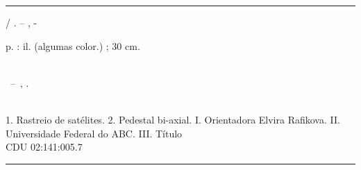 %
%     
\begin{fichacatalografica}
	\vspace*{\fill}					%
	\hrule							%
	\begin{center}					%
	\begin{minipage}[c]{12.5cm}		%
	
	\imprimirautor
	
	\hspace{0.5cm} \imprimirtitulo  / \imprimirautor. --
	\imprimirlocal, \imprimirdata-
	
	\hspace{0.5cm} \pageref{LastPage} p. : il. (algumas color.) ; 30 cm.\\
	
	\hspace{0.5cm} \imprimirorientadorRotulo~\imprimirorientador\\
	
	\hspace{0.5cm}
	\parbox[t]{\textwidth}{\imprimirtipotrabalho~--~\imprimirinstituicao,
	\imprimirdata.}\\
	
	\hspace{0.5cm}
		1. Rastreio de satélites.
		2. Pedestal bi-axial.
		I. Orientadora Elvira Rafikova.
		II. Universidade Federal do ABC.
		III. Título\\ 			
	
	\hspace{8.75cm} CDU 02:141:005.7\\
	
	\end{minipage}
	\end{center}
	\hrule
\end{fichacatalografica}
